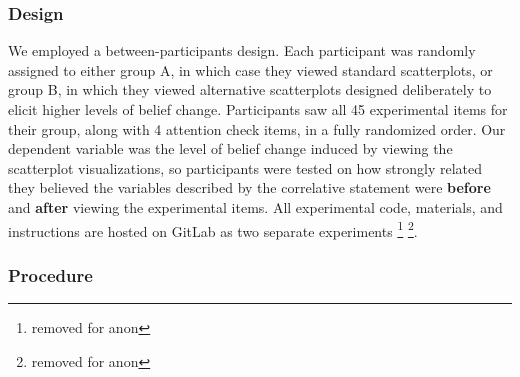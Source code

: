 \documentclass[manuscript,screen,review,anonymous]{acmart}
\begin{document}
\subsubsection{Design}\label{sec-design-main}

We employed a between-participants design. Each participant was randomly
assigned to either group A, in which case they viewed standard
scatterplots, or group B, in which they viewed alternative scatterplots
designed deliberately to elicit higher levels of belief change.
Participants saw all 45 experimental items for their group, along with 4
attention check items, in a fully randomized order. Our dependent
variable was the level of belief change induced by viewing the
scatterplot visualizations, so participants were tested on how strongly
related they believed the variables described by the correlative
statement were \textbf{before} and \textbf{after} viewing the
experimental items. All experimental code, materials, and instructions
are hosted on GitLab as two separate experiments \footnote{removed for
  anon} \footnote{removed for anon}.

\subsubsection{Procedure}\label{sec-procedure-main}
\end{document}
